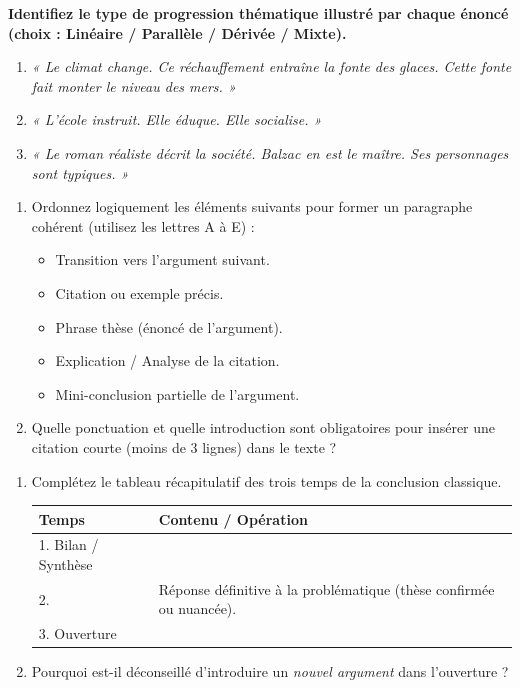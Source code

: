 \documentclass[11pt]{article}
\begin{document}
\begin{exercice}
\textbf{Identifiez le type de progression thématique illustré par chaque énoncé (choix : Linéaire / Parallèle / Dérivée / Mixte).}
\begin{enumerate}
    \item \textit{« Le climat change. Ce réchauffement entraîne la fonte des glaces. Cette fonte fait monter le niveau des mers. »}
    \item \textit{« L'école instruit. Elle éduque. Elle socialise. »}
    \item \textit{« Le roman réaliste décrit la société. Balzac en est le maître. Ses personnages sont typiques. »}
\end{enumerate}
\end{exercice}

\begin{exercice}
\begin{enumerate}
    \item Ordonnez logiquement les éléments suivants pour former un paragraphe cohérent (utilisez les lettres A à E) :
    \begin{itemize}
        \item[A.] Transition vers l'argument suivant.
        \item[B.] Citation ou exemple précis.
        \item[C.] Phrase thèse (énoncé de l'argument).
        \item[D.] Explication / Analyse de la citation.
        \item[E.] Mini-conclusion partielle de l'argument.
    \end{itemize}
    \item Quelle ponctuation et quelle introduction sont obligatoires pour insérer une citation courte (moins de 3 lignes) dans le texte ?
\end{enumerate}
\end{exercice}

\begin{exercice}
\begin{enumerate}
    \item Complétez le tableau récapitulatif des trois temps de la conclusion classique.
    \begin{tabular}{|l|p{8cm}|}
    \hline
    \textbf{Temps} & \textbf{Contenu / Opération} \\ \hline
    1. Bilan / Synthèse & \\ \hline
    2. \underline{\hspace{3cm}} & Réponse définitive à la problématique (thèse confirmée ou nuancée). \\ \hline
    3. Ouverture & \\ \hline
    \end{tabular}
    \item Pourquoi est-il déconseillé d'introduire un \textit{nouvel argument} dans l'ouverture ?
\end{enumerate}
\end{exercice}
\end{document}

